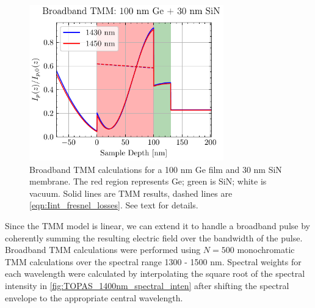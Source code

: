 \begin{figure}
	\centering
	\includegraphics[width=0.75\textwidth]{figures/chap4/TMM_1430_1450_broad_Int.pdf}
	\caption{Broadband TMM calculations for a {100 nm} Ge film and {30 nm} SiN membrane. The red region represents Ge; green is SiN; white is vacuum. Solid lines are TMM results, dashed lines are \cref{eqn:Iint_fresnel_losses}. See text for details.}
	\label{fig:TMM_1430_1450_broad_Int}
\end{figure}

Since the TMM model is linear, we can extend it to handle a broadband pulse by coherently summing the resulting electric field over the bandwidth of the pulse. Broadband TMM calculations were performed using $N=500$ monochromatic TMM calculations over the spectral range 1300 - 1500 nm. Spectral weights for each wavelength were calculated by interpolating the square root of the spectral intensity in \cref{fig:TOPAS_1400nm_spectral_inten} after shifting the spectral envelope to the appropriate central wavelength.

